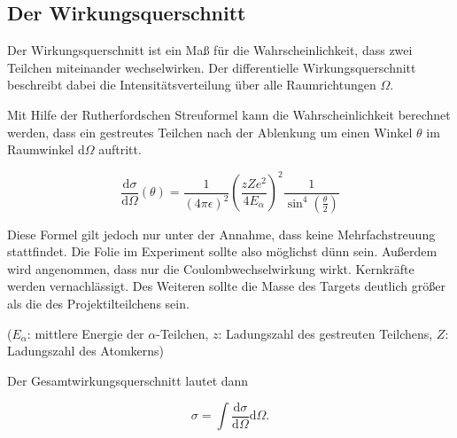 \subsection{Der Wirkungsquerschnitt}

Der Wirkungsquerschnitt ist ein Maß für die Wahrscheinlichkeit, dass zwei Teilchen miteinander wechselwirken. Der differentielle
Wirkungsquerschnitt beschreibt dabei die Intensitätsverteilung über alle Raumrichtungen $\Omega$.

Mit Hilfe der Rutherfordschen Streuformel kann die Wahrscheinlichkeit berechnet werden, dass ein gestreutes Teilchen nach der
Ablenkung um einen Winkel $\theta$ im Raumwinkel d$\Omega$ auftritt.

\begin{equation}
\frac{\mathrm{d}\sigma}{\mathrm{d}\Omega}(\theta)=\frac{1}{(4\pi\epsilon)^2}\left(\frac{z Z e^2}{4 E_{\alpha}}\right)^2\frac{1}{\sin^4{\left(\frac{\theta}{2}\right)}}
\end{equation}

Diese Formel gilt jedoch nur unter der Annahme, dass keine Mehrfachstreuung stattfindet. Die Folie im Experiment sollte
also möglichst dünn sein. Außerdem wird angenommen, dass nur die Coulombwechselwirkung wirkt. Kernkräfte werden vernachlässigt.
Des Weiteren sollte die Masse des Targets deutlich größer als die des Projektilteilchens sein.

($E_{\alpha}$: mittlere Energie der $\alpha$-Teilchen, $z$: Ladungszahl des gestreuten Teilchens, $Z$: Ladungszahl des Atomkerns)

Der Gesamtwirkungsquerschnitt lautet dann

\begin{equation}
  \sigma = \int \frac{\mathrm{d}\sigma}{\mathrm{d}\Omega}\mathrm{d}\Omega .
\end{equation}
